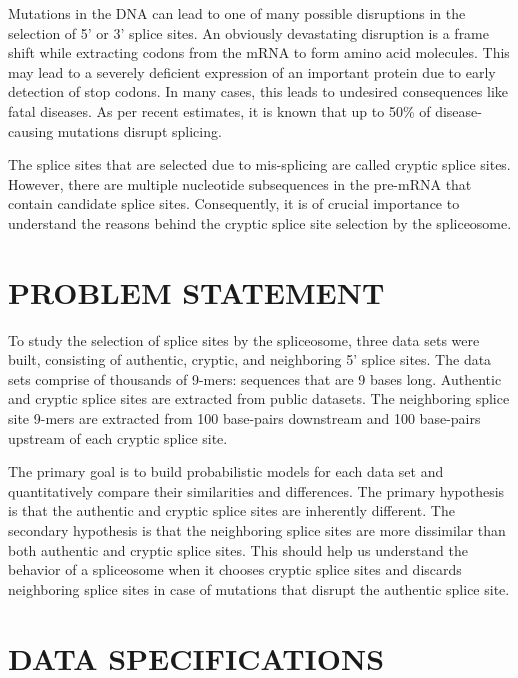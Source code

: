 \documentclass[12pt,a4paper]{article}
\begin{document}
	Mutations in the DNA can lead to one of many possible disruptions in the selection of 5’ or 3’ splice sites. An obviously devastating disruption is a frame shift while extracting codons from the mRNA to form amino acid molecules. This may lead to a severely deficient expression of an important protein due to early detection of stop codons. In many cases, this leads to undesired consequences like fatal diseases. As per recent estimates, it is known that up to 50\% of disease-causing mutations disrupt splicing. \par
	The splice sites that are selected due to mis-splicing are called cryptic splice sites. However, there are multiple nucleotide subsequences in the pre-mRNA that contain candidate splice sites. Consequently, it is of crucial importance to understand the reasons behind the cryptic splice site selection by the spliceosome.
	

	\section{\large PROBLEM STATEMENT}
	To study the selection of splice sites by the spliceosome, three data sets were built, consisting of authentic, cryptic, and neighboring 5’ splice sites. The data sets comprise of thousands of 9-mers: sequences that are 9 bases long. Authentic and cryptic splice sites are extracted from public datasets. The neighboring splice site 9-mers are extracted from 100 base-pairs downstream and 100 base-pairs upstream of each cryptic splice site. \par
	The primary goal is to build probabilistic models for each data set and quantitatively compare their similarities and differences. The primary hypothesis is that the authentic and cryptic splice sites are inherently different. The secondary hypothesis is that the neighboring splice sites are more dissimilar than both authentic and cryptic splice sites. This should help us understand the behavior of a spliceosome when it chooses cryptic splice sites and discards neighboring splice sites in case of mutations that disrupt the authentic splice site.
    
    \section{DATA SPECIFICATIONS}
\end{document}
